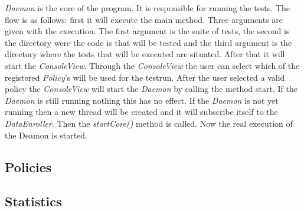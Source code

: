 \documentclass[i2]{oss}
\newcommand{\class}[1]{\emph{#1}}
\newcommand{\method}[1]{\emph{#1}}
\begin{document}
\class{Daemon} is the core of the program. %
It is responsible for running the tests. The flow is as follows: first it will execute the main method. %
Three arguments are given with the execution. The first argument is the suite of tests, the second is the directory were the code is that will be tested and the third argument is the directory where the tests that will be executed are situated. After that it will start the \class{ConsoleView}. Through the \class{ConsoleView} the user can select which of the registered \class{Policy}'s will be used for the testrun. After the user selected a valid policy the \class{ConsoleView} will start the \class{Daemon} by calling the method start. If the \class{Daemon} is still running nothing this has no effect. If the \class{Daemon} is not yet running then a new thread will be created and it will subscribe itself to the \class{DataEnroller}. 
Then the \method{startCore()} method is called. Now the real execution of the Deamon is started.

\subsection{Policies}
\label{subssec: Policies}



\subsection{Statistics}
\label{subssec: statistics}
\end{document}
